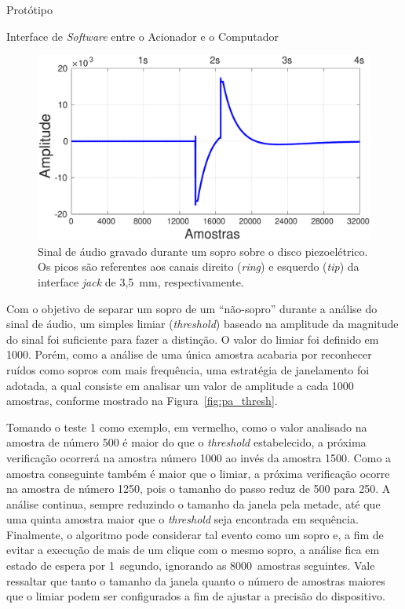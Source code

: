 \begin{chapter}{Protótipo}
\begin{section}{Interface de \textit{Software} entre o Acionador e o Computador}
\begin{figure}[!h]
	\centering
	\includegraphics[width=0.80\linewidth]{fig/pa_signal}
	\caption{Sinal de áudio gravado durante um sopro sobre o disco
	piezoelétrico. Os picos são referentes aos canais direito (\textit{ring}) e
	esquerdo (\textit{tip}) da interface \textit{jack} de 3,5~mm,
	respectivamente.}
	\label{fig:pa_signal}
\end{figure}
\vspace{-0.75cm}

Com o objetivo de separar um sopro de um ``não-sopro'' durante a análise do
sinal de áudio, um simples limiar (\textit{threshold}) baseado na amplitude da
magnitude do sinal foi suficiente para fazer a distinção. O valor do limiar foi
definido em 1000. Porém, como a análise de uma única amostra acabaria por
reconhecer ruídos como sopros com mais frequência, uma estratégia de janelamento
foi adotada, a qual consiste em analisar um valor de amplitude a cada 1000
amostras, conforme mostrado na Figura~\ref{fig:pa_thresh}.

Tomando o teste 1 como exemplo, em vermelho, como o valor analisado na amostra
de número 500 é maior do que o \textit{threshold} estabelecido, a próxima
verificação ocorrerá na amostra número 1000 ao invés da amostra 1500. Como a
amostra conseguinte também é maior que o limiar, a próxima verificação ocorre na
amostra de número 1250, pois o tamanho do passo reduz de 500 para 250. A análise
continua, sempre reduzindo o tamanho da janela pela metade, até que uma quinta
amostra maior que o \textit{threshold} seja encontrada em sequência. Finalmente,
o algoritmo pode considerar tal evento como um sopro e, a fim de evitar a
execução de mais de um clique com o mesmo sopro, a análise fica em estado de
espera por 1~segundo, ignorando as 8000~amostras seguintes. Vale ressaltar que
tanto o tamanho da janela quanto o número de amostras maiores que o limiar podem
ser configurados a fim de ajustar a precisão do dispositivo. 


\end{section}
\end{chapter}
